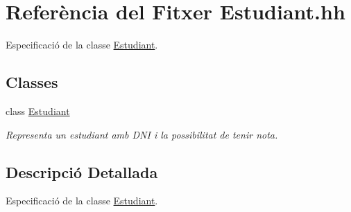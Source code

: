 \hypertarget{_estudiant_8hh}{}\section{Referència del Fitxer Estudiant.\+hh}
\label{_estudiant_8hh}


Especificació de la classe \hyperlink{class_estudiant}{Estudiant}.  


\subsection*{Classes}
\begin{DoxyCompactItemize}
\item 
class \hyperlink{class_estudiant}{Estudiant}
\begin{DoxyCompactList}\small\item\em Representa un estudiant amb D\+NI i la possibilitat de tenir nota. \end{DoxyCompactList}\end{DoxyCompactItemize}


\subsection{Descripció Detallada}
Especificació de la classe \hyperlink{class_estudiant}{Estudiant}. 

